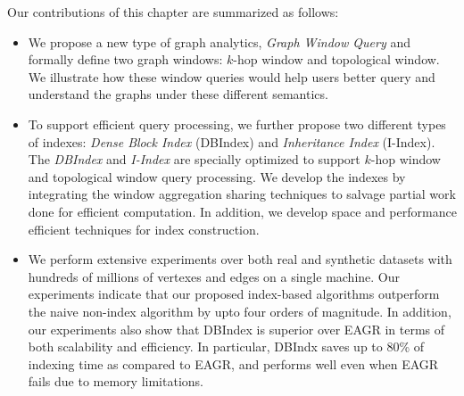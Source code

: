  
Our contributions of this chapter are summarized as follows:
\begin{itemize}
\item{We propose a new type of graph analytics, \emph{Graph Window Query} and formally define two graph windows: $k$-hop window and topological window. We illustrate how these window queries would help users better query and
understand the graphs under these different semantics.}

\item{To support efficient query processing, we further propose two different types of indexes: \emph{Dense Block Index} (DBIndex) and \emph{Inheritance Index} (I-Index). The
\emph{DBIndex} and \emph{I-Index} are specially 
optimized to support $k$-hop window and topological window query processing. 
We develop the indexes by integrating the window aggregation sharing techniques to salvage partial work done for efficient computation. In addition, we develop space and performance efficient techniques for index construction. 
}

\item{We perform extensive experiments over both real and synthetic datasets
with hundreds of millions of vertexes and edges on a single machine. Our experiments 
indicate that our proposed index-based algorithms outperform the naive non-index
algorithm by upto four orders of magnitude. In addition, our experiments also show 
that DBIndex is superior over EAGR in terms of both scalability and efficiency. 
In particular, DBIndx saves up to 80\% of indexing time as compared to EAGR, 
and performs well even when EAGR fails due to memory limitations. 
}
\end{itemize}
